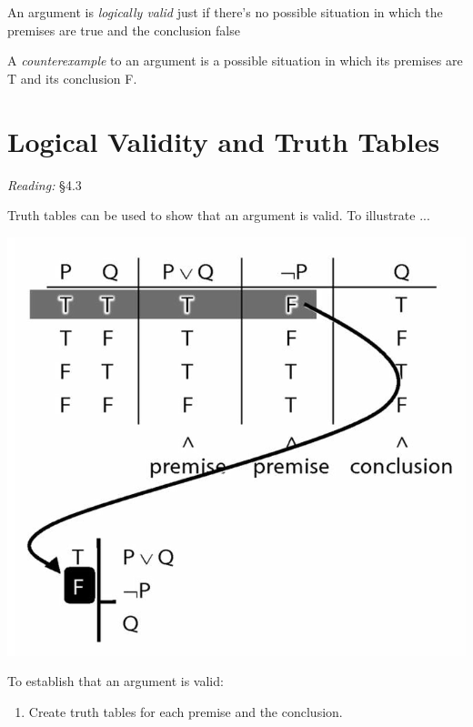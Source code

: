 \documentclass[12pt]{extarticle}
\begin{document}
\begin{multicols*}{3}
An argument is \emph{logically valid} just if there’s no possible situation in which the premises are true and the conclusion false
 
A \emph{counterexample} to an argument is a possible situation in which its premises are T and its conclusion F.
 
 
 
\section{Logical Validity and Truth Tables}
 
\emph{Reading:} §4.3
 
\begin{minipage}{\columnwidth}
 
Truth tables can be used to show that an argument is valid. To illustrate ...
 
\begin{center}
\includegraphics[scale=0.3]{img/unit_14_example.png}
\end{center}
\end{minipage}
 
\begin{minipage}{\columnwidth}
 
To establish that an argument is valid:
 
\begin{enumerate}
 
\item Create truth tables for each premise and the conclusion.
 

\end{enumerate}
\end{minipage}
\end{multicols*}
\end{document}

